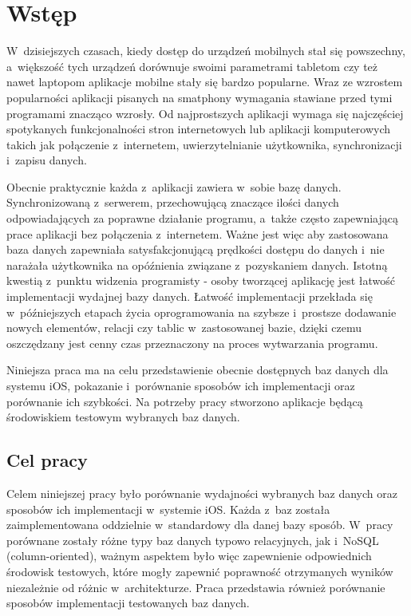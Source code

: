 \section{Wstęp}

 W~dzisiejszych czasach, kiedy dostęp do urządzeń mobilnych stał się powszechny, a~większość tych urządzeń dorównuje swoimi parametrami tabletom czy też nawet laptopom aplikacje mobilne stały się bardzo popularne. Wraz ze wzrostem popularności aplikacji pisanych na smatphony wymagania stawiane przed tymi programami znacząco wzrosły. Od najprostszych aplikacji wymaga się najczęściej spotykanych funkcjonalności stron internetowych lub aplikacji komputerowych takich jak połączenie z~internetem, uwierzytelnianie użytkownika, synchronizacji i~zapisu danych. \nocite{Swift-doc} \nocite{Realm-doc} \nocite{FMDB-doc} \nocite{CoreData-doc} \nocite{PorownanieRealm} \nocite{Mockaroo} \nocite{PorownanieDrDobbs} \nocite{SQLite-book} \nocite{CoreDataBook} \nocite{Art2Key} \nocite{Art3Key} \nocite{Art4Key}
\par
Obecnie praktycznie każda z~aplikacji zawiera w~sobie bazę danych. Synchronizowaną z~serwerem, przechowującą znaczące ilości danych odpowiadających za poprawne działanie programu, a~także często zapewniającą prace aplikacji bez połączenia z~internetem. Ważne jest więc aby zastosowana baza danych zapewniała satysfakcjonującą prędkości dostępu do danych i~nie narażała użytkownika na opóźnienia związane z~pozyskaniem danych. Istotną kwestią z~punktu widzenia programisty - osoby tworzącej aplikację jest łatwość implementacji wydajnej bazy danych. Łatwość implementacji przekłada się w~późniejszych etapach życia oprogramowania na szybsze i~prostsze dodawanie nowych elementów, relacji czy tablic w~zastosowanej bazie, dzięki czemu oszczędzany jest cenny czas przeznaczony na proces wytwarzania programu. \par

Niniejsza praca ma na celu przedstawienie obecnie dostępnych baz danych dla systemu iOS, pokazanie i~porównanie  sposobów ich implementacji oraz porównanie ich szybkości. Na potrzeby pracy stworzono aplikacje będącą środowiskiem testowym wybranych baz danych. 
	
\subsection{Cel pracy}

Celem niniejszej pracy było porównanie wydajności wybranych baz danych oraz sposobów ich implementacji w~systemie iOS. Każda z~baz została zaimplementowana oddzielnie w~standardowy dla danej bazy sposób. W~pracy porównane zostały różne typy baz danych typowo relacyjnych, jak i~NoSQL (column-oriented), ważnym aspektem było więc zapewnienie odpowiednich środowisk testowych, które mogły zapewnić poprawność otrzymanych wyników niezależnie od różnic w~architekturze. Praca przedstawia również porównanie sposobów implementacji testowanych baz danych.\par

